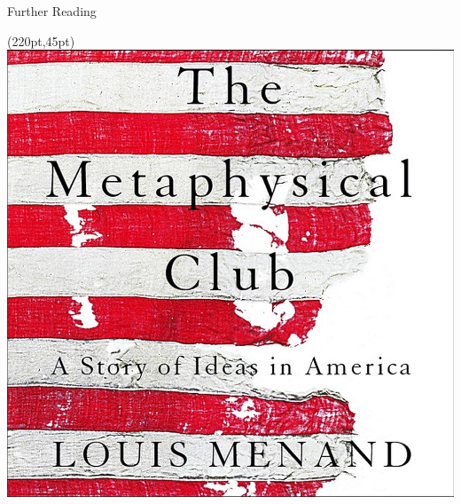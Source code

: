 \documentclass{beamer}
\begin{document}
\begin{frame}{Further Reading}
	\begin{textblock*}{60pt}(220pt,45pt)
		\includegraphics[width=1\textwidth]{../images/metaphysicalclub.jpg}
	\end{textblock*}


\end{frame}
\end{document}

